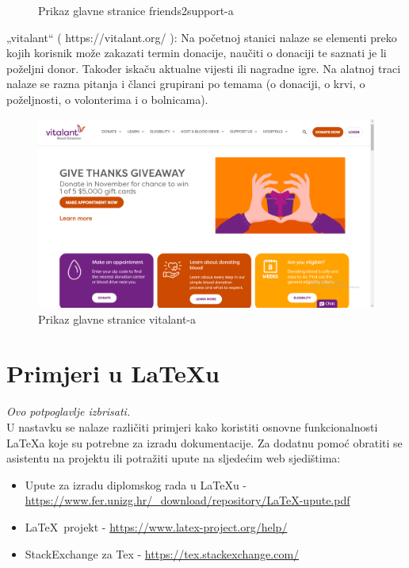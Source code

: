 \begin{packed_item}
\begin{figure}[H]
				\centering
				\caption{Prikaz glavne stranice friends2support-a}
				\label{fig:promjene}
			\end{figure}
			\item  „vitalant“ ( https://vitalant.org/ ):
			Na početnoj stanici nalaze se elementi preko kojih korisnik  može zakazati termin donacije, naučiti o donaciji te saznati je li poželjni donor. 						Također iskaču aktualne vijesti ili nagradne igre. Na alatnoj traci nalaze se razna pitanja i članci grupirani po temama (o donaciji, o krvi,  o 						poželjnosti, o volonterima i o bolnicama).
			\begin{figure}[H]
				\includegraphics[scale=0.23]{slike/vitalant.PNG} 
				\centering
				\caption{Prikaz glavne stranice vitalant-a}
				\label{fig:promjene}
			\end{figure}
		\end{packed_item}

		\eject
		
		\section{Primjeri u \LaTeX u}
		
		\textit{Ovo potpoglavlje izbrisati.}\\

		U nastavku se nalaze različiti primjeri kako koristiti osnovne funkcionalnosti \LaTeX a koje su potrebne za izradu dokumentacije. Za dodatnu pomoć obratiti se asistentu na projektu ili potražiti upute na sljedećim web sjedištima:
		\begin{itemize}
			\item Upute za izradu diplomskog rada u \LaTeX u - \url{https://www.fer.unizg.hr/_download/repository/LaTeX-upute.pdf}
			\item \LaTeX\ projekt - \url{https://www.latex-project.org/help/}
			\item StackExchange za Tex - \url{https://tex.stackexchange.com/}\\
		
		\end{itemize} 	


